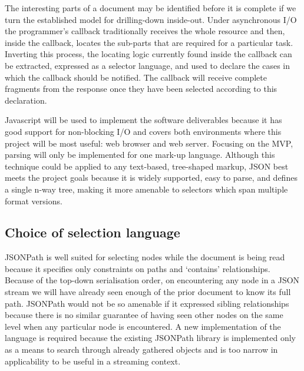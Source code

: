 \documentclass[12pt, ]{article}
\begin{document}
The interesting parts of a document may be identified before it is
complete if we turn the established model for drilling-down inside-out.
Under asynchronous I/O the programmer's callback traditionally receives
the whole resource and then, inside the callback, locates the sub-parts
that are required for a particular task. Inverting this process, the
locating logic currently found inside the callback can be extracted,
expressed as a selector language, and used to declare the cases in which
the callback should be notified. The callback will receive complete
fragments from the response once they have been selected according to
this declaration.

Javascript will be used to implement the software deliverables because
it has good support for non-blocking I/O and covers both environments
where this project will be most useful: web browser and web server.
Focusing on the MVP, parsing will only be implemented for one mark-up
language. Although this technique could be applied to any text-based,
tree-shaped markup, JSON best meets the project goals because it is
widely supported, easy to parse, and defines a single n-way tree, making
it more amenable to selectors which span multiple format versions.

\subsection{Choice of selection
language}\label{choice-of-selection-language}

JSONPath is well suited for selecting nodes while the document is being
read because it specifies only constraints on paths and `contains'
relationships. Because of the top-down serialisation order, on
encountering any node in a JSON stream we will have already seen enough
of the prior document to know its full path. JSONPath would not be so
amenable if it expressed sibling relationships because there is no
similar guarantee of having seen other nodes on the same level when any
particular node is encountered. A new implementation of the language is
required because the existing JSONPath library is implemented only as a
means to search through already gathered objects and is too narrow in
applicability to be useful in a streaming context.
\end{document}
